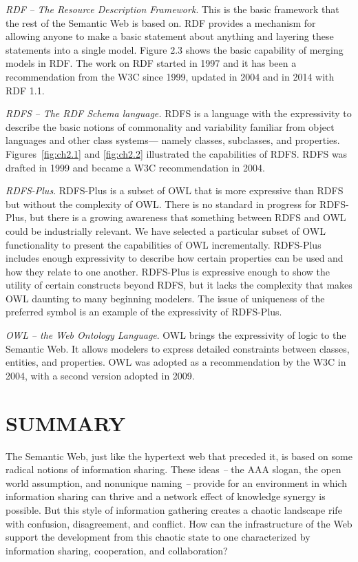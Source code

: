 \emph{RDF} \emph{--} \emph{The Resource Description Framework}. This is
the basic framework that the rest of the Semantic Web is based on. RDF
provides a mechanism for allowing anyone to make a basic statement about
anything and layering these statements into a single model. Figure 2.3
shows the basic capability of merging models in RDF. The work on RDF
started in 1997 and it has been a recommendation from the W3C since
1999, updated in 2004 and in 2014 with RDF 1.1.

\emph{RDFS} \emph{-- The RDF Schema language.} RDFS is a language with
the expressivity to describe the basic notions of commonality and
variability familiar from object languages and other class systems---
namely classes, subclasses, and properties. Figures~\ref{fig:ch2.1} and \ref{fig:ch2.2}
illustrated the capabilities of RDFS. RDFS was drafted in 1999 and
became a W3C recommendation in 2004.

\emph{RDFS-Plus}. RDFS-Plus is a subset of OWL that is more expressive
than RDFS but without the complexity of OWL. There is no standard in
progress for RDFS-Plus, but there is a growing awareness that something
between RDFS and OWL could be industrially relevant. We have selected a
particular subset of OWL functionality to present the capabilities of
OWL incrementally. RDFS-Plus includes enough expressivity to describe
how certain properties can be used and how they relate to one another.
RDFS-Plus is expressive enough to show the utility of certain constructs
beyond RDFS, but it lacks the complexity that makes OWL daunting to many
beginning modelers. The issue of uniqueness of the preferred symbol is
an example of the expressivity of RDFS-Plus.

\emph{OWL} \emph{-- the Web Ontology Language}. OWL brings the
expressivity of logic to the Semantic Web. It allows modelers to express
detailed constraints between classes, entities, and properties. OWL was
adopted as a recommendation by the W3C in 2004, with a second version
adopted in 2009.

\section{SUMMARY}

The Semantic Web, just like the hypertext web that preceded it, is based
on some radical notions of information sharing. These ideas \emph{--}
the AAA slogan, the open world assumption, and nonunique naming
\emph{--} provide for an environment in which information sharing can
thrive and a network effect of knowledge synergy is possible. But this
style of information gathering creates a chaotic landscape rife with
confusion, disagreement, and conflict. How can the infrastructure of the
Web support the development from this chaotic state to one characterized
by information sharing, cooperation, and collaboration?

